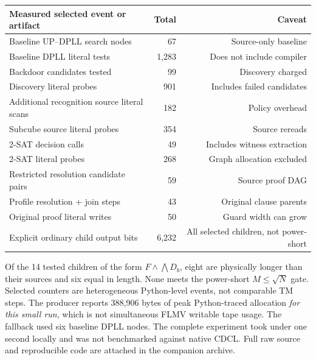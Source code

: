 \documentclass[11pt]{article}
\begin{document}
\begin{center}\begin{tabular}{lrr}\toprule
Measured selected event or artifact & Total & Caveat \\
\midrule
Baseline UP--DPLL search nodes & 67 & Source-only baseline \\
Baseline DPLL literal tests & 1,283 & Does not include compiler \\
Backdoor candidates tested & 99 & Discovery charged \\
Discovery literal probes & 901 & Includes failed candidates \\
Additional recognition source literal scans & 182 & Policy overhead \\
Subcube source literal probes & 354 & Source rereads \\
2-SAT decision calls & 49 & Includes witness extraction \\
2-SAT literal probes & 268 & Graph allocation excluded \\
Restricted resolution candidate pairs & 59 & Source proof DAG \\
Profile resolution + join steps & 43 & Original clause parents \\
Original proof literal writes & 50 & Guard width can grow \\
Explicit ordinary child output bits & 6,232 & All selected children, not power-short \\
\bottomrule\end{tabular}\end{center}

Of the 14 tested children of the form $F\wedge\bigwedge D_b$, eight are physically longer than their sources and six equal in length. None meets the power-short $M\le\sqrt N$ gate. Selected counters are heterogeneous Python-level events, not comparable TM steps. The producer reports 388,906 bytes of peak Python-traced allocation \emph{for this small run}, which is not simultaneous FLMV writable tape usage. The fallback used six baseline DPLL nodes. The complete experiment took under one second locally and was not benchmarked against native CDCL. Full raw source and reproducible code are attached in the companion archive.
\end{document}
